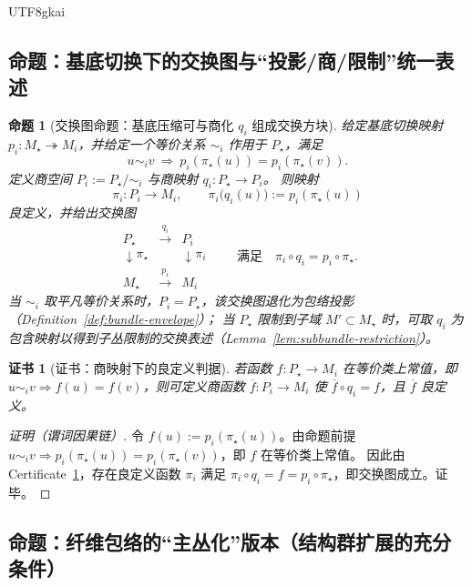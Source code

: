\documentclass[12pt]{article}
\newtheorem{proposition}{命题}[section]
\newtheorem{certificate}{证书}[section]
\begin{document}
\begin{CJK*}{UTF8}{gkai}
\subsection{命题：基底切换下的交换图与“投影/商/限制”统一表述}

\begin{proposition}[交换图命题：基底压缩可与商化 $q_i$ 组成交换方块]
\label{prop:commuting-square}
给定基底切换映射 $p_i:M_\star\twoheadrightarrow M_i$，并给定一个等价关系 $\sim_i$ 作用于 $P_\star$，满足
\[
u\sim_i v\ \Longrightarrow\ p_i(\pi_\star(u))=p_i(\pi_\star(v)).
\]
定义商空间 $P_i:=P_\star/\!\sim_i$ 与商映射 $q_i:P_\star\to P_i$。
则映射
\[
\pi_i:P_i\to M_i,\qquad
\pi_i\bigl(q_i(u)\bigr):=p_i(\pi_\star(u))
\]
良定义，并给出交换图
\[
\begin{array}{ccc}
P_\star & \xrightarrow{\ q_i\ } & P_i \\
\downarrow \pi_\star & & \downarrow \pi_i \\
M_\star & \xrightarrow{\ p_i\ } & M_i
\end{array}
\qquad
\text{满足}\quad
\pi_i\circ q_i=p_i\circ\pi_\star.
\]
当 $\sim_i$ 取平凡等价关系时，$P_i=P_\star$，该交换图退化为包络投影（Definition~\ref{def:bundle-envelope}）；
当 $P_\star$ 限制到子域 $M'\subset M_\star$ 时，可取 $q_i$ 为包含映射以得到子丛限制的交换表述（Lemma~\ref{lem:subbundle-restriction}）。
\end{proposition}

\begin{certificate}[证书：商映射下的良定义判据]
\label{cert:commuting-square}
若函数 $f:P_\star\to M_i$ 在等价类上常值，即 $u\sim_i v\Rightarrow f(u)=f(v)$，则可定义商函数 $\overline{f}:P_i\to M_i$ 使 $\overline{f}\circ
  q_i=f$，且 $\overline{f}$ 良定义。
\end{certificate}

\begin{proof}[证明（谓词因果链）]
令 $f(u):=p_i(\pi_\star(u))$。由命题前提 $u\sim_i v\Rightarrow p_i(\pi_\star(u))=p_i(\pi_\star(v))$，即 $f$ 在等价类上常值。
因此由 Certificate~\ref{cert:commuting-square}，存在良定义函数 $\pi_i$ 满足 $\pi_i\circ q_i=f=p_i\circ\pi_\star$，即交换图成立。证毕。
\end{proof}

\subsection{命题：纤维包络的“主丛化”版本（结构群扩展的充分条件）}


\end{CJK*}
\end{document}
